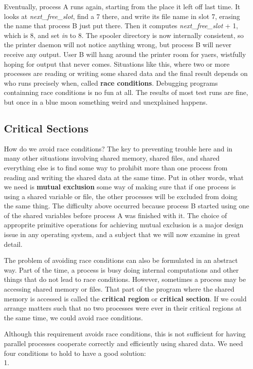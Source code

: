 \documentclass{book}
\newcommand {\kw}  [1] {\textbf{#1}}
\newcommand {\sys} [1] {\textsl{#1}}
\begin{document}
Eventually, process A runs again, starting from the place it left off last time.
It looks at \sys{next\_free\_slot}, find a 7 there, and write its file name in slot 7, erasing the name that process B just put there.
Then it computes \sys{next\_free\_slot} + 1, which is 8, and set \sys{in} to 8.
The spooler directory is now internally consistent, so the printer daemon will not notice anything wrong,
but process B will never receive any output.
User B will hang around the printer room for yaers, wistfully hoping for output that never comes.
Situations like this, where two or more processes are reading or writing some shared data 
and the final result depends on who runs precisely when, called \kw{race conditions}.
Debugging programs containning race conditions is no fun at all.
The results of most test runs are fine, but once in a blue moon something weird and unexplained happens.

\subsection{Critical Sections}
How do we avoid race conditions?
The key to preventing trouble here and in many other situations involving shared memory, shared files, and shared everything else 
is to find some way to prohibit more than one process from reading and writing the shared data at the same time.
Put in other words, what we need is \kw{mutual exclusion} some way of making sure that
if one process is using a shared variable or file, the other processes will be excluded from doing the same thing.
The difficulty above occurred because process B started using one of the shared variables before process A was finished with it.
The choice of approprite primitive operations for achieving mutual exclusion is a major design issue in any operating system,
and a subject that we will now examine in great detail.

The problem of avoiding race conditions can also be formulated in an abstract way.
Part of the time, a process is busy doing internal computations and other things that do not lead to race conditions.
However, sometimes a process may be accessing shared memory or files.
That part of the program where the shared memory is accessed is called the \kw{critical region} or \kw{critical section}.
If we could arrange matters such that no two processes were ever in their critical regions at the same time, we could avoid race conditions.

Although this requirement avoids race conditions, 
this is not sufficient for having parallel processes cooperate correctly and efficiently using shared data.
We need four conditions to hold to have a good solution:\\
1. 























\end{document}
